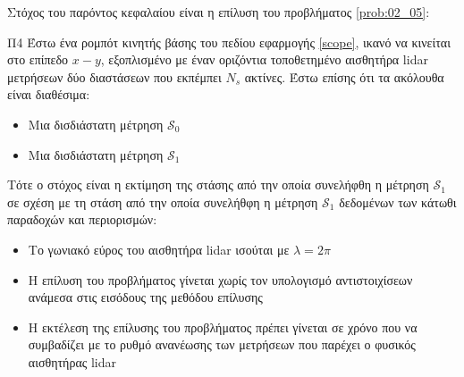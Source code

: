 Στόχος του παρόντος κεφαλαίου είναι η επίλυση του προβλήματος \ref{prob:02_05}:

\begin{bw_box}
\begin{customproblem}{Π4}
  \label{prob:02_05}
  Έστω ένα ρομπότ κινητής βάσης του πεδίου εφαρμογής \ref{scope}, ικανό να
  κινείται στο επίπεδο $x-y$, εξοπλισμένο με έναν οριζόντια τοποθετημένο
  αισθητήρα lidar μετρήσεων δύο διαστάσεων που εκπέμπει $N_s$ ακτίνες. Έστω
  επίσης ότι τα ακόλουθα είναι διαθέσιμα:
  \begin{itemize}
    \item Μια δισδιάστατη μέτρηση $\mathcal{S}_0$
    \item Μια δισδιάστατη μέτρηση $\mathcal{S}_1$
  \end{itemize}
\end{customproblem}
Τότε ο στόχος είναι η εκτίμηση της στάσης από την οποία συνελήφθη η μέτρηση
$\mathcal{S}_1$ σε σχέση με τη στάση από την οποία συνελήθφη η μέτρηση
$\mathcal{S}_1$ δεδομένων των κάτωθι παραδοχών και περιορισμών:
\begin{itemize}
  \item Το γωνιακό εύρος του αισθητήρα lidar ισούται με $\lambda = 2\pi$
  \item Η επίλυση του προβλήματος γίνεται χωρίς τον υπολογισμό αντιστοιχίσεων
        ανάμεσα στις εισόδους της μεθόδου επίλυσης
  \item Η εκτέλεση της επίλυσης του προβλήματος πρέπει γίνεται σε χρόνο που να
        συμβαδίζει με το ρυθμό ανανέωσης των μετρήσεων που παρέχει ο φυσικός
        αισθητήρας lidar
\end{itemize}

\end{bw_box}
